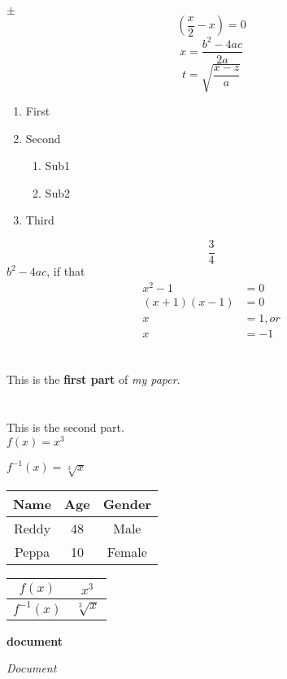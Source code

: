 \documentclass[12pt]{article}
\begin{document}
$\pm$
$$\left(\frac{x}{2}-x\right)=0$$
$$x=\frac{b^2-4ac}{2a}$$
$$t=\sqrt{\frac{x-z}{a}}$$
\begin{enumerate}
\item First
\item Second
	\begin{enumerate}
	\item Sub1
	\item Sub2
	\end{enumerate}
\item Third
\end{enumerate}
$$\frac{3}{4}$$
$b^2-4ac$, if that
\begin{align*}
x^2-1&=0\\
(x+1)(x-1)&=0\\
x&=1, or \\
x&=-1
\end{align*}

\part{}
This is the \textbf{first part} of \emph{my paper}.
\part{}
This is the second part.\\
$ f(x)=x^3 $

$f^{-1}(x)=\sqrt[3]{x}$

\begin{tabular}{|c|c|c|}
\hline 
Name & Age& Gender \\ 
\hline 
Reddy& 48 & Male \\ 
\hline 
Peppa& 10 & Female \\ 
\hline 
\end{tabular} 

\vspace{1cm}
\begin{tabular}{|c|c|}
\hline 
$f(x)$ & $x^3$ \\ 
\hline 
$f^{-1}(x)$ & $\sqrt [3]{x}$ \\ 
\hline 
\end{tabular} 

\vspace{1cm}
\textbf{document }

\textit{Document}
\end{document}
